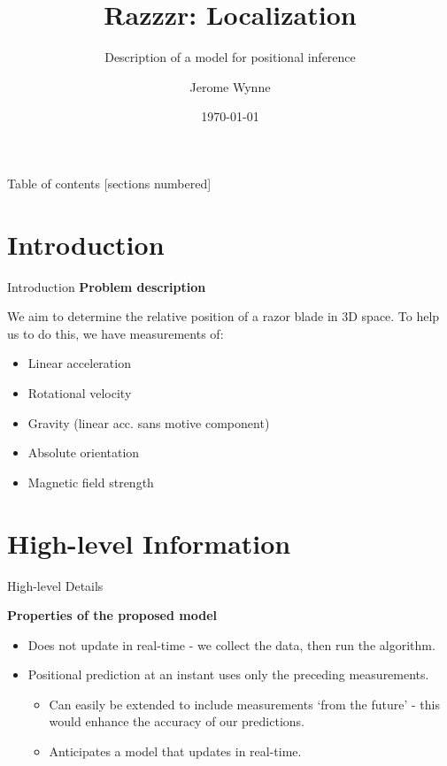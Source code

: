\documentclass[10pt]{beamer}
\title{Razzzr: Localization}
\subtitle{Description of a model for positional inference}
\date{\today}
\author{Jerome Wynne}
\begin{document}
\maketitle

\begin{frame}{Table of contents}
  [sections numbered]
  \tableofcontents[hideallsubsections]
\end{frame}

\section{Introduction}

\begin{frame}[fragile]{Introduction}
	\textbf{Problem description}
	
	We aim to determine the relative position of a razor blade in 3D space. To help us to do this, we have measurements of:
	\begin{itemize}
		\item Linear acceleration
		\item Rotational velocity
		\item Gravity (linear acc. sans motive component)
		\item Absolute orientation
		\item Magnetic field strength
	\end{itemize}
\end{frame}

\section{High-level Information}

\begin{frame}{High-level Details}

	\textbf{Properties of the proposed model}
	\begin{itemize}
		\item Does not update in real-time - we collect the data, then run the algorithm.
		\item Positional prediction at an instant uses only the preceding measurements.
		\begin{itemize}
			\item Can easily be extended to include measurements `from the future' - this would enhance the accuracy of our predictions.
			\item Anticipates a model that updates in real-time.
		\end{itemize}
	\end{itemize}
	
\end{frame}
\end{document}

